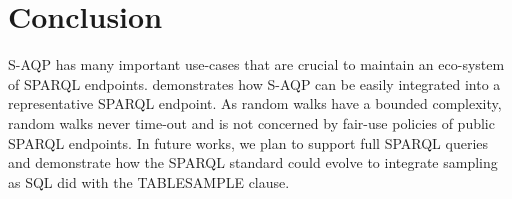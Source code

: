 
\section{Conclusion}

S-AQP has many important use-cases that are crucial to maintain an
eco-system of SPARQL endpoints. \NAME demonstrates how S-AQP can be
easily integrated into a representative SPARQL endpoint. As random
walks have a bounded complexity, random walks never time-out and is
not concerned by fair-use policies of public SPARQL endpoints.  In
future works, we plan to support full SPARQL queries and demonstrate
how the SPARQL standard could  evolve to integrate sampling as SQL
did with the TABLESAMPLE clause.
